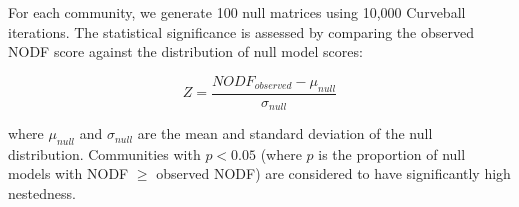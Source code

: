 For each community, we generate 100 null matrices using 10,000 Curveball iterations. The statistical significance is assessed by comparing the observed NODF score against the distribution of null model scores:


\begin{equation}
Z = \frac{NODF_{observed} - \mu_{null}}{\sigma_{null}}
\end{equation}

where $\mu_{null}$ and $\sigma_{null}$ are the mean and standard deviation of the null distribution. Communities with $p < 0.05$ (where $p$ is the proportion of null models with NODF $\geq$ observed NODF) are considered to have significantly high nestedness.

